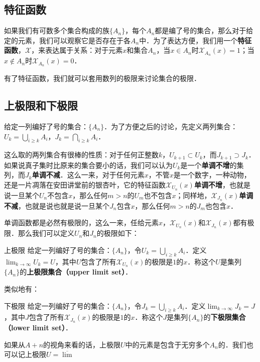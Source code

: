 
\subsection{特征函数}
如果我们有可数多个集合构成的族$\{A_n\}$，每个$A_n$都是编了号的集合，那么对于给定的元素，我们可以观察它是否存在于各$A_n$中．为了表达方便，我们用一个\textbf{特征函数}，$\mathcal{X}$，来表达属于关系：对于元素$x$和集合$A_n$，当$x\in A_n$时$\mathcal{X}_{A_n}(x)=1$；当$x\not\in A_n$时$\mathcal{X}_{A_n}(x)=0$．

有了特征函数，我们就可以套用数列的极限来讨论集合的极限．

\subsection{上极限和下极限}
给定一列编好了号的集合：$\{A_n\}$．为了方便之后的讨论，先定义两列集合：$U_k=\bigcup_{i\ge k}A_i$，$J_k=\bigcap_{i\ge k}A_i$．

这么取的两列集合有很棒的性质：对于任何正整数$k$，$U_{k+1}\subset U_k$，而$J_{k+1}\supset J_k$．如果说真子集时比原来的集合要小的话，我们可以认为$U_k$是一个\textbf{单调不增}的集列，而$J_k$\textbf{单调不减}．这么一来，对于任何元素$x$，不管$x$是一个数字，一种动物，还是一片凋落在安田讲堂前的银杏叶，它的特征函数$\mathcal{X}_{U_n}(x)$\textbf{单调不增}，也就是说一旦某个$U_n$不包含$x$，那么任何$m>n$的$U_m$也不包含$x$；同样地，$\mathcal{X}_{J_n}(x)$\textbf{单调不减}，也就是说也就是说一旦某个$J_n$包含$x$，那么任何$m>n$的$J_m$也包含$x$．

单调函数都是必然有极限的，这么一来，任给元素$x$，$\mathcal{X}_{U_n}(x)$和$\mathcal{X}_{J_n}(x)$都有极限．那么我们可以定义$U_n$和$J_n$的极限如下：

\begin{definition}{上极限}
给定一列编好了号的集合：$\{A_n\}$，令$U_k=\bigcup_{i\ge k}A_i$．定义$\lim_{k\rightarrow\infty} U_k=U$，其中$U$包含了所有$\mathcal{X}_{U_n}(x)$的极限是$1$的$x$．称这个$U$是集列$\{A_n\}$的\textbf{上极限集合（upper limit set）}．
\end{definition}

类似地有：

\begin{definition}{下极限}
给定一列编好了号的集合：$\{A_n\}$，令$J_k=\bigcup_{i\ge k}A_i$．定义$\lim_{k\rightarrow\infty} J_k=J$，其中$J$包含了所有$\mathcal{X}_{J_n}(x)$的极限是$1$的$x$．称这个$J$是集列$\{A_n\}$的\textbf{下极限集合（lower limit set）}．
\end{definition}

如果从$A+n$的视角来看的话，上极限$U$中的元素是包含于无穷多个$A_n$的．我们也可以记上极限$U=\overline{\lim}$